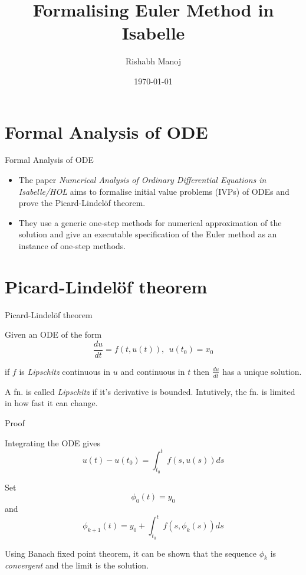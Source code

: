 \documentclass{beamer}
\title{Formalising Euler Method in Isabelle}
\author{Rishabh Manoj}
\institute{International Institute of Information Technology - Bangalore}
\date{\today}
\begin{document}
\begin{frame}
  \titlepage
\end{frame}




\section{Formal Analysis of ODE}

\begin{frame}{Formal Analysis of ODE}{}
\begin{itemize}
    \item The paper \textit{Numerical Analysis of Ordinary Differential
Equations in Isabelle/HOL} aims to formalise initial value problems (IVPs) of ODEs and prove the Picard-Lindel\"of theorem.\\ 
    \item They use a generic one-step methods for numerical approximation of the solution and give an executable specification of the Euler method as an instance
of one-step methods.  
\end{itemize}

\end{frame}


\section{Picard-Lindel\"of theorem}

\begin{frame}{Picard-Lindel\"of theorem}{}

  Given an ODE of the form 
   $$ \frac{du}{dt} = f(t,u(t)), \ \ u(t_0) = x_0$$

 if $f$ is \textit{Lipschitz} continuous in $u$ and continuous in $t$ then $\frac{du}{dt}$ has a unique solution.
 
 A fn. is called \textit{Lipschitz} if it's derivative is bounded. Intutively, the fn. is limited in how fast it can change. 
\end{frame}

\begin{frame}{Proof}{}

  Integrating the ODE gives 
   $$ u(t) - u(t_0)= \int_{t_0}^{t} f(s,u(s)) ds$$
   
   Set
      $$\phi_0(t) = y_0$$
    and
    $$\phi_{k+1}(t) = y_0 + \int_{t_0}^{t} f(s,\phi_{k}(s)) ds$$    

 Using Banach fixed point theorem, it can be shown that the sequence $\phi_k$ is \emph{convergent} and the limit is the solution. \cite{Wiki}
\end{frame}
\end{document}
